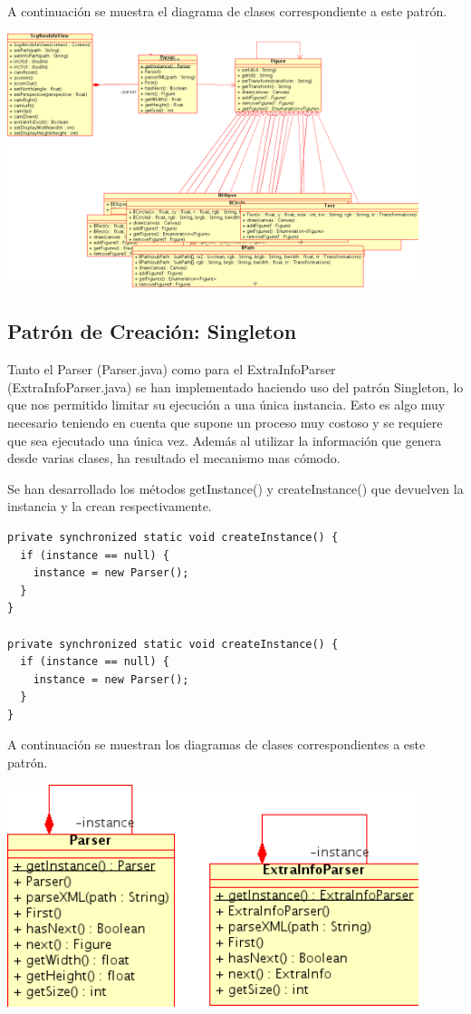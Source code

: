 \documentclass[a4paper,10pt]{article}
\begin{document}
A continuación se muestra el diagrama de clases correspondiente a este patrón.

\begin{center}
 \includegraphics[width=12cm]{texres/builder.png}
\end{center}

\subsection{Patrón de Creación: Singleton}

Tanto el Parser (Parser.java) como para el ExtraInfoParser (ExtraInfoParser.java) se han implementado haciendo uso del patrón Singleton, lo que nos permitido limitar su ejecución a una única instancia. Esto es algo muy necesario teniendo en cuenta que supone un proceso muy costoso y se requiere que sea ejecutado una única vez. Además al utilizar la información que genera desde varias clases, ha resultado el mecanismo mas cómodo.

Se han desarrollado los métodos getInstance() y createInstance() que devuelven la instancia y la crean respectivamente.

\begin{verbatim}
private synchronized static void createInstance() {
  if (instance == null) {
    instance = new Parser();
  }
}

private synchronized static void createInstance() {
  if (instance == null) {
    instance = new Parser();
  }
}
\end{verbatim} 

A continuación se muestran los diagramas de clases correspondientes a este patrón.

\begin{center}
 \includegraphics[width=12cm]{texres/singleton.png}
\end{center}
\end{document}
